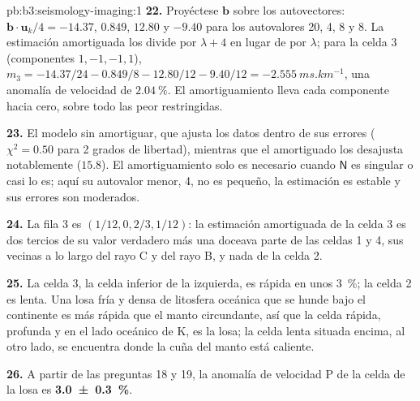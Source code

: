 \begin{solution}{pb:b3:seismology-imaging:1}
\textbf{22.} Proyéctese $\mathbf b$ sobre los autovectores: $\mathbf b\cdot\mathbf u_k/4
= -14.37$, $0.849$, $12.80$ y $-9.40$ para los autovalores 20, 4, 8 y 8.
La estimación amortiguada los divide por $\lambda + 4$ en lugar de por $\lambda$; para
la celda 3 (componentes $1, -1, -1, 1$),
$m_3 = -14.37/24 - 0.849/8 - 12.80/12 - 9.40/12 = \qty{-2.555}{ms.km^{-1}}$,
una anomalía de velocidad de $\qty{+2.04}{\percent}$. El amortiguamiento lleva cada componente
hacia cero, sobre todo las peor restringidas.

\textbf{23.} El modelo sin amortiguar, que ajusta los datos dentro de sus errores
($\chi^2 = 0.50$ para 2 grados de libertad), mientras que el amortiguado los
desajusta notablemente ($15.8$). El amortiguamiento solo es necesario cuando
$\mathsf N$ es singular o casi lo es; aquí su autovalor menor, 4, no es pequeño, la
estimación es estable y sus errores son moderados.

\textbf{24.} La fila 3 es $(1/12, 0, 2/3, 1/12)$: la estimación amortiguada de la
celda 3 es dos tercios de su valor verdadero más una doceava parte de las celdas 1 y 4,
sus vecinas a lo largo del rayo C y del rayo B, y nada de la celda 2.

\textbf{25.} La celda 3, la celda inferior de la izquierda, es rápida en unos
\qty{3}{\percent}; la celda 2 es lenta. Una losa fría y densa de litosfera oceánica
que se hunde bajo el continente es más rápida que el manto circundante, así que
la celda rápida, profunda y en el lado oceánico de K, es la losa; la celda lenta
situada encima, al otro lado, se encuentra donde la cuña del manto está caliente.

\textbf{26.} A partir de las preguntas 18 y 19, la anomalía de velocidad P de la celda de la losa es
\textbf{\qty[text-series-to-math=true, uncertainty-mode=separate]{3.0 \pm 0.3}{\percent}}.
\end{solution}
